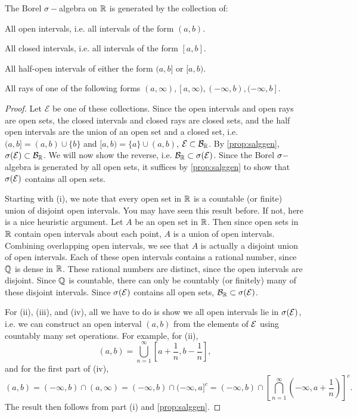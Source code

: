 \documentclass[main.tex]{subfiles}
\begin{document}
\begin{proposition}\label{prop:BorelRgen}
The Borel $\sigma-$algebra on ${\mathbb R}$ is generated by the collection of:
\begin{romannum}
	\item All open intervals, i.e. all intervals of the form $(a, b)$.
	\item All closed intervals, i.e. all intervals of the form $[a, b]$.
	\item All half-open intervals of either the form $(a, b]$ or $[a, b)$.
	\item All rays of one of the following forms $(a, \infty), [a, \infty), (-\infty, b), (-\infty, b]$.
\end{romannum}
\begin{proof}
Let $\mathcal{E}$ be one of these collections. Since the open intervals and open rays are open sets, the closed intervals and closed rays are closed sets, and the half open intervals are the union of an open set and a closed set, i.e. $(a, b] = (a, b)\cup\{b\}$ and $[a, b) = \{a\}\cup(a, b)$, ${\mathcal E} \subset {\mathcal B}_{\mathbb R}$. By \cref{prop:salggen}, ${\sigma}({\mathcal E}) \subset {\mathcal B}_{\mathbb R}$. We will now show the reverse, i.e. ${\mathcal B}_{\mathbb R} \subset {\sigma}({\mathcal E})$. Since the Borel ${\sigma}-$algebra is generated by all open sets, it suffices by \cref{prop:salggen} to show that ${\sigma}({\mathcal E})$ contains all open sets. 

Starting with (i), we note that every open set in ${\mathbb R}$ is a countable (or finite) union of disjoint open intervals. You may have seen this result before. If not, here is a nice heuristic argument. Let $A$ be an open set in ${\mathbb R}$. Then since open sets in ${\mathbb R}$ contain open intervals about each point, $A$ is a union of open intervals. Combining overlapping open intervals, we see that $A$ is actually a disjoint union of open intervals. Each of these open intervals contains a rational number, since $\mathbb{Q}$ is dense in ${\mathbb R}$. These rational numbers are distinct, since the open intervals are disjoint. Since $\mathbb{Q}$ is countable, there can only be countably (or finitely) many of these disjoint intervals. Since ${\sigma}({\mathcal E})$ contains all open sets, ${\mathcal B}_{\mathbb R} \subset {\sigma}({\mathcal E})$.

For (ii), (iii), and (iv), all we have to do is show we all open intervals lie in ${\sigma}({\mathcal E})$, i.e. we can construct an open interval $(a, b)$ from the elements of ${\mathcal E}$ using countably many set operations. For example, for (ii),
\[
(a, b) = \bigcup_{n=1}^\infty \left[ a + \frac{1}{n}, b - \frac{1}{n} \right],
\]
and for the first part of (iv),
\[
(a,b) = (-\infty,b) \cap (a,\infty) = (-\infty,b) \cap (-\infty, a]^c 
= (-\infty,b) \cap \left[ \bigcap_{n=1}^\infty \left(-\infty, a+\frac{1}{n}\right) \right]^c.
\]
The result then follows from part (i) and \cref{prop:salggen}.
\end{proof}
\end{proposition}
\end{document}
